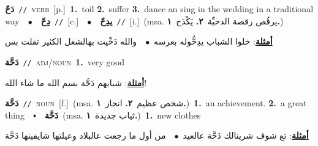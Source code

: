 \documentclass[10pt,a4paper,twoside]{article} %
\begin{document}
\begin{multicols}{2}
{\setlength\topsep{0pt}\textbf{\foreignlanguage{arabic}{دَحّ}}\ {\color{gray}\texttt{//}\color{black}}\ \textsc{verb}\ [p.]\ \textbf{1.}~toil  \textbf{2.}~suffer  \textbf{3.}~dance an sing in the wedding in a traditional way\ \ $\bullet$\ \ \setlength\topsep{0pt}\textbf{\foreignlanguage{arabic}{دِحّ}}\ {\color{gray}\texttt{//}\color{black}}\ [c.]\ \ $\bullet$\ \ \setlength\topsep{0pt}\textbf{\foreignlanguage{arabic}{يدِحّ}}\ {\color{gray}\texttt{//}\color{black}}\ [i.]\ \color{gray}(msa. \foreignlanguage{arabic}{يرقُص رقصة الدحيِّة}~\foreignlanguage{arabic}{\textbf{٢.}}  \foreignlanguage{arabic}{يَكْدَح}~\foreignlanguage{arabic}{\textbf{١.}})\color{black}\  \begin{flushright}\color{gray}\foreignlanguage{arabic}{\textbf{\underline{\foreignlanguage{arabic}{أمثلة}}}: خلوا الشباب يدِحُّوله بعرسه\ $\bullet$\ \  والله دَحِّيت بهالشغل الكثير تقلت بس}\end{flushright}\color{black}} \vspace{2mm}

{\setlength\topsep{0pt}\textbf{\foreignlanguage{arabic}{دَحَّة}}\ {\color{gray}\texttt{//}\color{black}}\ \textsc{adj/noun}\ \textbf{1.}~very good\  \begin{flushright}\color{gray}\foreignlanguage{arabic}{\textbf{\underline{\foreignlanguage{arabic}{أمثلة}}}: شبابهم دَحَّة بسم الله ما شاء الله!}\end{flushright}\color{black}} \vspace{2mm}

{\setlength\topsep{0pt}\textbf{\foreignlanguage{arabic}{دَحَّة}}\ {\color{gray}\texttt{//}\color{black}}\ \textsc{noun}\ [f.]\ \color{gray}(msa. \foreignlanguage{arabic}{شخص عظيم}~\foreignlanguage{arabic}{\textbf{٢.}}  \foreignlanguage{arabic}{انجاز}~\foreignlanguage{arabic}{\textbf{١.}})\color{black}\ \textbf{1.}~an achievement.  \textbf{2.}~a great thing\ \ $\smblkdiamond$\ \ \setlength\topsep{0pt}\textbf{\foreignlanguage{arabic}{دَحَّة}}\ \color{gray}(msa. \foreignlanguage{arabic}{ثياب جديدة}~\foreignlanguage{arabic}{\textbf{١.}})\color{black}\ \textbf{1.}~new clothes\  \begin{flushright}\color{gray}\foreignlanguage{arabic}{\textbf{\underline{\foreignlanguage{arabic}{أمثلة}}}: تع شوف شرينالك دَحَّة عالعيد\ $\bullet$\ \  من أول ما رجعت عالبلاد وعيلتها شايفينها دَحَّة}\end{flushright}\color{black}} \vspace{2mm}


\end{multicols}
\end{document}
